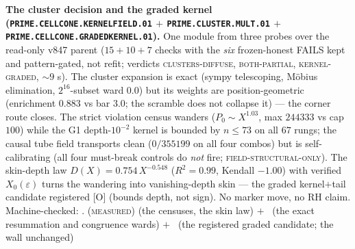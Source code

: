 \par\smallskip\noindent\textbf{The cluster decision and the
graded kernel (\texttt{PRIME.CELLCONE.KERNELFIELD.01} $+$
\texttt{PRIME.CLUSTER.MULT.01} $+$
\texttt{PRIME.CELLCONE.GRADEDKERNEL.01}).}
One module from three probes over the read-only v847 parent
($15 + 10 + 7$ checks with the \emph{six} frozen-honest FAILS
kept and pattern-gated, not refit; verdicts
\textsc{clusters-diffuse}, \textsc{both-partial},
\textsc{kernel-graded}, ${\sim}9$ s).  The cluster expansion is
exact (sympy telescoping, M\"obius elimination, $2^{16}$-subset
ward $0.0$) but its weights are position-geometric (enrichment
$0.883$ vs bar $3.0$; the scramble does not collapse it) --- the
corner route closes.  The strict violation census wanders ($P_0
\sim X^{1.03}$, max $244333$ vs cap $100$) while the G1
depth-$10^{-2}$ kernel is bounded by $n \le 73$ on all $67$
rungs; the causal tube field transports clean ($0/355199$ on all
four combos) but is self-calibrating (all four must-break
controls do \emph{not} fire; \textsc{field-structural-only}).
The skin-depth law $D(X) = 0.754\,X^{-0.548}$ ($R^2 = 0.99$,
Kendall $-1.00$) with verified $X_0(\varepsilon)$ turns the
wandering into vanishing-depth skin --- the graded kernel$+$tail
candidate registered [O] (bounds depth, not sign).  No marker
move, no RH claim.
Machine-checked: .
(\textsc{measured}) (the censuses, the skin law) $+$ \mE\ (the
exact resummation and congruence wards) $+$ \mO\ (the registered
graded candidate; the wall unchanged)
\par\smallskip


